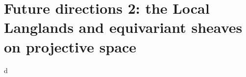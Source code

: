 
\section{Future directions 2: the Local Langlands and equivariant sheaves on projective space}




d
